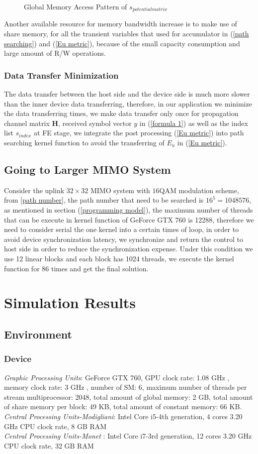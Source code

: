 \documentclass[12pt,a4paper,final]{article}
\begin{document}
\begin{spacing}{2.5}
\begin{figure}[htb]
\caption{Global Memory Access Pattern of $\mathit{s_{potential matrix}}$}
\label{coalesce global memory}
\end{figure}
 Another available resource for memory bandwidth increase is to make use of share memory, for all the transient variables that used for accumulator in (\ref{path searching}) and (\ref{Eu metric}), because of the small capacity consumption and large amount of R/W operations.   
\subsubsection{Data Transfer Minimization}   
The data transfer between the host side and the device side is much more slower than the inner device data transferring, therefore, in our application we minimize the data transferring times, we make data transfer only once for propagation channel matrix $\mathbf{H}$, received symbol vector $y$ in (\ref{formula 1}) as well as the index list $\mathit{s_{index}}$ at FE stage, we integrate the post processing (\ref{Eu metric}) into path searching kernel function to avoid the transferring of $E_{u}$ in (\ref{Eu metric}).  
\subsection{Going to Larger MIMO System}
  Consider the uplink $32\times 32$ MIMO system with $16$QAM modulation scheme, from \ref{path number}, the path number that need to be searched is $16^{5}=1048576$, as mentioned in section (\ref{programming model}), the maximum number of threads that can be execute in kernel function of GeForce GTX 760 is 12288, therefore we need to consider serial the one kernel into a certain times of loop, in order to avoid device synchronization latency, we synchronize and return the control to host side in order to reduce the synchronization expense. Under this condition we use 12 linear blocks and each block has 1024 threads, we execute the kernel function for 86 times and get the final solution.
\section{Simulation Results}\label{simulation}
\subsection{Environment}
\subsubsection{Device}
\emph{Graphic Processing Units}: GeForce GTX 760, GPU clock rate: 1.08 GHz , memory clock rate: 3 GHz , number of SM: 6, maximum number of threads per stream multiprocessor: 2048, total amount of global memory: 2 GB, total amount of share memory per block: 49 KB, total amount of constant memory: 66 KB. \\
\emph{Central Processing Units-Modigliani}: Intel Core i5-4th generation, 4 cores 3.20 GHz CPU clock rate, 8 GB RAM\\
\emph{Central Processing Units-Monet} : Intel Core i7-3rd generation, 12 cores 3.20 GHz CPU clock rate, 32 GB RAM\\

\end{spacing}
\end{document}
